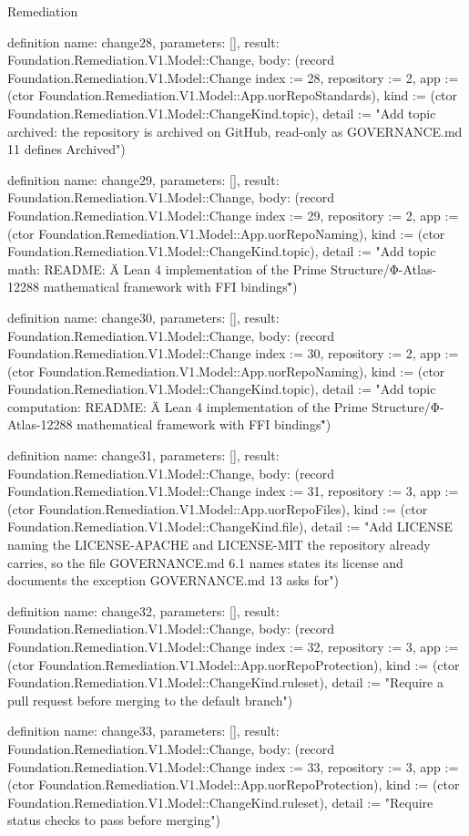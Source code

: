 \begin{lexlean}{Remediation}
\begin{semanticmodule}
definition{
  name: change28,
  parameters: [],
  result: Foundation.Remediation.V1.Model::Change,
  body: (record Foundation.Remediation.V1.Model::Change {index := 28, repository := 2, app := (ctor Foundation.Remediation.V1.Model::App.uorRepoStandards), kind := (ctor Foundation.Remediation.V1.Model::ChangeKind.topic), detail := "Add topic archived: the repository is archived on GitHub, read-only as GOVERNANCE.md 11 defines Archived"})
}

definition{
  name: change29,
  parameters: [],
  result: Foundation.Remediation.V1.Model::Change,
  body: (record Foundation.Remediation.V1.Model::Change {index := 29, repository := 2, app := (ctor Foundation.Remediation.V1.Model::App.uorRepoNaming), kind := (ctor Foundation.Remediation.V1.Model::ChangeKind.topic), detail := "Add topic math: README: \"A Lean 4 implementation of the Prime Structure/Φ-Atlas-12288 mathematical framework with FFI bindings\""})
}

definition{
  name: change30,
  parameters: [],
  result: Foundation.Remediation.V1.Model::Change,
  body: (record Foundation.Remediation.V1.Model::Change {index := 30, repository := 2, app := (ctor Foundation.Remediation.V1.Model::App.uorRepoNaming), kind := (ctor Foundation.Remediation.V1.Model::ChangeKind.topic), detail := "Add topic computation: README: \"A Lean 4 implementation of the Prime Structure/Φ-Atlas-12288 mathematical framework with FFI bindings\""})
}

definition{
  name: change31,
  parameters: [],
  result: Foundation.Remediation.V1.Model::Change,
  body: (record Foundation.Remediation.V1.Model::Change {index := 31, repository := 3, app := (ctor Foundation.Remediation.V1.Model::App.uorRepoFiles), kind := (ctor Foundation.Remediation.V1.Model::ChangeKind.file), detail := "Add LICENSE naming the LICENSE-APACHE and LICENSE-MIT the repository already carries, so the file GOVERNANCE.md 6.1 names states its license and documents the exception GOVERNANCE.md 13 asks for"})
}

definition{
  name: change32,
  parameters: [],
  result: Foundation.Remediation.V1.Model::Change,
  body: (record Foundation.Remediation.V1.Model::Change {index := 32, repository := 3, app := (ctor Foundation.Remediation.V1.Model::App.uorRepoProtection), kind := (ctor Foundation.Remediation.V1.Model::ChangeKind.ruleset), detail := "Require a pull request before merging to the default branch"})
}

definition{
  name: change33,
  parameters: [],
  result: Foundation.Remediation.V1.Model::Change,
  body: (record Foundation.Remediation.V1.Model::Change {index := 33, repository := 3, app := (ctor Foundation.Remediation.V1.Model::App.uorRepoProtection), kind := (ctor Foundation.Remediation.V1.Model::ChangeKind.ruleset), detail := "Require status checks to pass before merging"})
}


\end{semanticmodule}
\end{lexlean}
